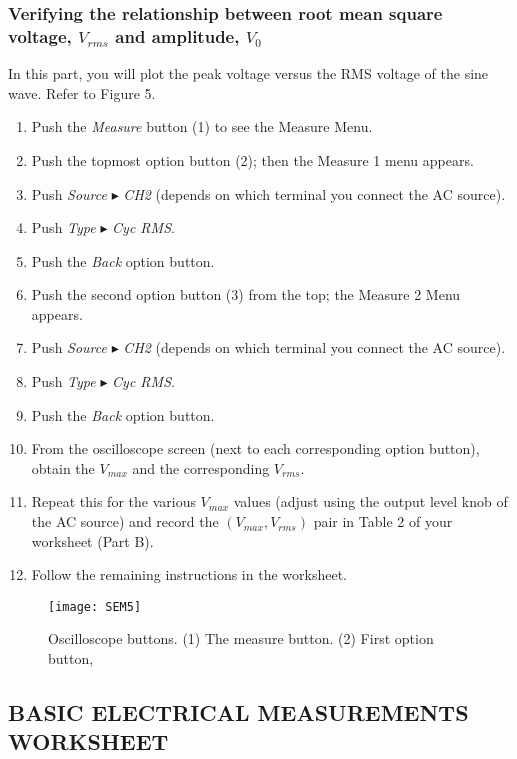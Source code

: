 \documentclass[twocolumn,a4paper,11pt]{article}
\begin{document}
\subsubsection*{Verifying the relationship between root mean square voltage, \( V_{rms} \) and amplitude, \( V_0 \)}
In this part, you will plot the peak voltage versus the RMS voltage of the sine wave. Refer to Figure 5.

\begin{enumerate}
    \item Push the \textit{Measure} button (1) to see the Measure Menu.
    \item Push the topmost option button (2); then the Measure 1 menu appears.
    \item Push \textit{Source} $\blacktriangleright$ \textit{CH2} (depends on which terminal you connect the AC source).
    \item Push \textit{Type} $\blacktriangleright$ \textit{Cyc RMS}.
    \item Push the \textit{Back} option button.
    \item Push the second option button (3) from the top; the Measure 2 Menu appears.
    \item Push \textit{Source} $\blacktriangleright$ \textit{CH2} (depends on which terminal you connect the AC source).
    \item Push \textit{Type} $\blacktriangleright$ \textit{Cyc RMS}.
    \item Push the \textit{Back} option button.
    \item From the oscilloscope screen (next to each corresponding option button), obtain the \( V_{max} \) and the corresponding \( V_{rms} \).
    \item Repeat this for the various \( V_{max} \) values (adjust using the output level knob of the AC source) and record the \( (V_{max}, V_{rms}) \) pair in Table 2 of your worksheet (Part B).
    \item Follow the remaining instructions in the worksheet.
\end{enumerate}

\begin{figure}[htbp]
\centering
\texttt{[image: SEM5]}
\caption{Oscilloscope buttons. (1) The measure button. (2) First option button, }
\label{6}
\end{figure}
\newpage

\hfill
\newpage
\hfill
\newpage
\subsection*{BASIC ELECTRICAL MEASUREMENTS WORKSHEET}
\end{document}
